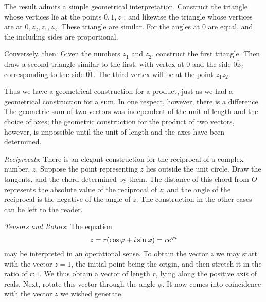 \documentclass[letter,oneside]{memoir}
\begin{document}
The result admits a simple geometrical interpretation. Construct the triangle whose vertices lie at the points $0, 1, z_1$; and likewise the triangle whose vertices are at $0, z_2, z_1, z_2$. These triangle are similar. For the angles at $0$ are equal, and the including sides are proportional. 

Conversely, then: Given the numbers $z_1$ and $z_2$, construct the first triangle. Then draw a second triangle similar to the first, with vertex at $0$ and the side $\overline{0z_2}$ corresponding to the side $\overline{01}$. The third vertex will be at the point $z_1z_2$. 

\begin{wrapfigure}{R}{0.2\textwidth}
\end{wrapfigure} 
Thus we have a geometrical construction for a product, just as we had a geometrical construction for a sum. In one respect, however, there is a difference. The geometric sum of two vectors was independent of the unit of length and the choice of axes; the geometric construction for the product of two vectors, however, is impossible until the unit of length and the axes have been determined. 

\emph{Reciprocals}: There is an elegant construction for the reciprocal of a complex number, $z$. Suppose the point representing $z$ lies outside the unit circle. Draw the tangents, and the chord determined by them. The distance of this chord from $O$ represents the absolute value of the reciprocal of $z$; and the angle of the reciprocal is the negative of the angle of $z$. The construction in the other cases can be left to the reader.

\emph{Tensors and Rotors}: The equation
\[
	z=r\pbr*{\cos \phi +i\sin \phi } =r e^{\phi i}
\] may be interpreted in an operational sense. To obtain the vector $z$ we may start with the vector $z=1$, the initial point being the origin, and then stretch it in the ratio of $r :1$. We thus obtain a vector of length $r$, lying along the positive axis of reals. Next, rotate this vector through the angle $\phi $. It now comes into coincidence with the vector $z$ we wished generate.
\end{document}

